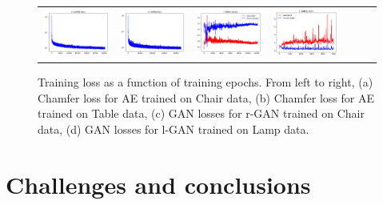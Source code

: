 \documentclass[12pt]{article}
\newcommand{\contentdescription}[1]{}
\begin{document}
    \begin{figure}
        \centering
        \begin{tabular}{lllllll}
            \includegraphics[width = 30mm]{chair_l_gan_curves} &
            \includegraphics[width = 30mm]{table_l_gan_curves} &
            \includegraphics[width = 30mm]{chair_raw_gan_curves} &
            \includegraphics[width = 30mm]{lamp_raw_gan_curves} \\
        \end{tabular}
        \caption{Training loss as a function of training epochs. From left to right, (a) Chamfer loss for AE trained on Chair data, (b) Chamfer loss for AE trained on Table data, (c) GAN losses for r-GAN trained on Chair data, (d) GAN losses for l-GAN trained on Lamp data.}
        \label{figure:curves_for_latent_gan_and_raw_gan}
    \end{figure}


    \section{Challenges and conclusions}
    \label{sec:conclusions}
    \contentdescription{
        Challenges and Conclusions (5-15\%):
        Challenges you faced when reimplementing the paper and conducting the experiments.
        Were all details in the paper?
        Or did you have to look in the authors code or even contact them to find about some details?
        Were parts of the code quite hard to get them to work as intended?
        Did you have optimize and tune several hyperparameters?
        Which ones?
        Did the framework you used make the implementation difficult in some ways?

        Summarize your key results - what have you learned?
        What points do you think one should consider when using the approach of the paper you chose for your project?
        Suggest ideas for future extensions or new applications of your ideas.
    }
\end{document}

